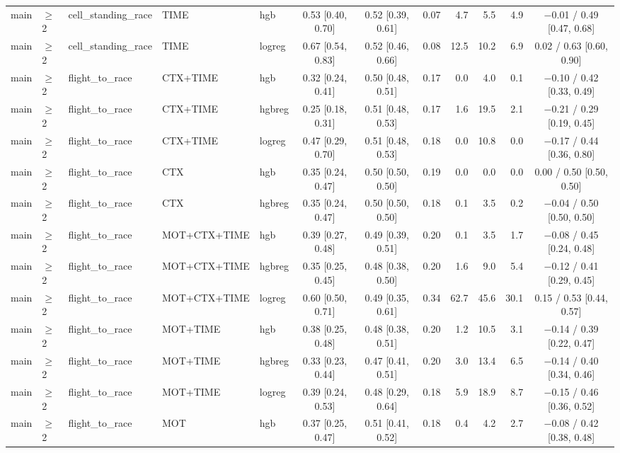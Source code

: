 \begin{longtable}{@{}lllllcccrrrc@{}}
main & $\geq$2 & cell\_standing\_race & TIME & hgb & 0.53 [0.40, 0.70] & 0.52 [0.39, 0.61] & 0.07 & 4.7 & 5.5 & 4.9 & $-$0.01 / 0.49 [0.47, 0.68] \\
main & $\geq$2 & cell\_standing\_race & TIME & logreg & 0.67 [0.54, 0.83] & 0.52 [0.46, 0.66] & 0.08 & 12.5 & 10.2 & 6.9 & 0.02 / 0.63 [0.60, 0.90] \\
main & $\geq$2 & flight\_to\_race & CTX+TIME & hgb & 0.32 [0.24, 0.41] & 0.50 [0.48, 0.51] & 0.17 & 0.0 & 4.0 & 0.1 & $-$0.10 / 0.42 [0.33, 0.49] \\
main & $\geq$2 & flight\_to\_race & CTX+TIME & hgbreg & 0.25 [0.18, 0.31] & 0.51 [0.48, 0.53] & 0.17 & 1.6 & 19.5 & 2.1 & $-$0.21 / 0.29 [0.19, 0.45] \\
main & $\geq$2 & flight\_to\_race & CTX+TIME & logreg & 0.47 [0.29, 0.70] & 0.51 [0.48, 0.53] & 0.18 & 0.0 & 10.8 & 0.0 & $-$0.17 / 0.44 [0.36, 0.80] \\
main & $\geq$2 & flight\_to\_race & CTX & hgb & 0.35 [0.24, 0.47] & 0.50 [0.50, 0.50] & 0.19 & 0.0 & 0.0 & 0.0 & 0.00 / 0.50 [0.50, 0.50] \\
main & $\geq$2 & flight\_to\_race & CTX & hgbreg & 0.35 [0.24, 0.47] & 0.50 [0.50, 0.50] & 0.18 & 0.1 & 3.5 & 0.2 & $-$0.04 / 0.50 [0.50, 0.50] \\
main & $\geq$2 & flight\_to\_race & MOT+CTX+TIME & hgb & 0.39 [0.27, 0.48] & 0.49 [0.39, 0.51] & 0.20 & 0.1 & 3.5 & 1.7 & $-$0.08 / 0.45 [0.24, 0.48] \\
main & $\geq$2 & flight\_to\_race & MOT+CTX+TIME & hgbreg & 0.35 [0.25, 0.45] & 0.48 [0.38, 0.50] & 0.20 & 1.6 & 9.0 & 5.4 & $-$0.12 / 0.41 [0.29, 0.45] \\
main & $\geq$2 & flight\_to\_race & MOT+CTX+TIME & logreg & 0.60 [0.50, 0.71] & 0.49 [0.35, 0.61] & 0.34 & 62.7 & 45.6 & 30.1 & 0.15 / 0.53 [0.44, 0.57] \\
main & $\geq$2 & flight\_to\_race & MOT+TIME & hgb & 0.38 [0.25, 0.48] & 0.48 [0.38, 0.51] & 0.20 & 1.2 & 10.5 & 3.1 & $-$0.14 / 0.39 [0.22, 0.47] \\
main & $\geq$2 & flight\_to\_race & MOT+TIME & hgbreg & 0.33 [0.23, 0.44] & 0.47 [0.41, 0.51] & 0.20 & 3.0 & 13.4 & 6.5 & $-$0.14 / 0.40 [0.34, 0.46] \\
main & $\geq$2 & flight\_to\_race & MOT+TIME & logreg & 0.39 [0.24, 0.53] & 0.48 [0.29, 0.64] & 0.18 & 5.9 & 18.9 & 8.7 & $-$0.15 / 0.46 [0.36, 0.52] \\
main & $\geq$2 & flight\_to\_race & MOT & hgb & 0.37 [0.25, 0.47] & 0.51 [0.41, 0.52] & 0.18 & 0.4 & 4.2 & 2.7 & $-$0.08 / 0.42 [0.38, 0.48] \\

\end{longtable}
